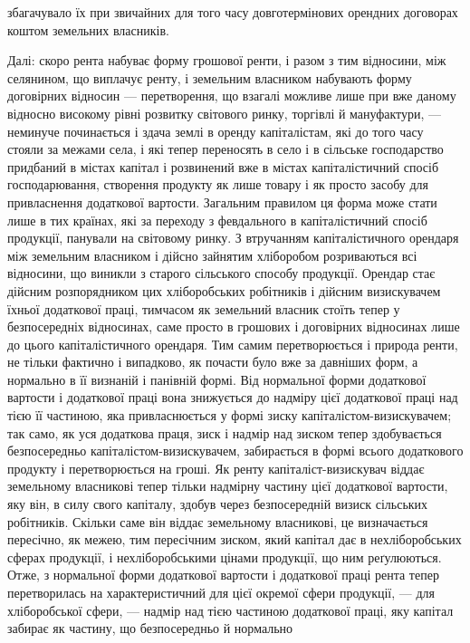 збагачувало їх при звичайних для того часу довготермінових орендних договорах
коштом земельних власників.

Далі: скоро рента набуває форму грошової ренти, і разом з тим відносини,
між селянином, що виплачує ренту, і земельним власником набувають форму
договірних відносин — перетворення, що взагалі можливе лише при вже даному
відносно високому рівні розвитку світового ринку, торгівлі й мануфактури, —
неминуче починається і здача землі в оренду капіталістам, які до того часу
стояли за межами села, і які тепер переносять в село і в сільське господарство
придбаний в містах капітал і розвинений вже в містах капіталістичний спосіб
господарювання, створення продукту як лише товару і як просто засобу для
привласнення додаткової вартости. Загальним правилом ця форма може стати
лише в тих країнах, які за переходу з февдального в капіталістичний спосіб
продукції, панували на світовому ринку. З втручанням капіталістичного орендаря
між земельним власником і дійсно зайнятим хліборобом розриваються всі
відносини, що виникли з старого сільського способу продукції. Орендар стає
дійсним розпорядником цих хліборобських робітників і дійсним визискувачем
їхньої додаткової праці, тимчасом як земельний власник стоїть тепер
у безпосередніх відносинах, саме просто в грошових і договірних відносинах
лише до цього капіталістичного орендаря. Тим самим перетворюється
і природа ренти, не тільки фактично і випадково, як почасти було вже за
давніших форм, а нормально в її визнаній і панівній формі. Від нормальної
форми додаткової вартости і додаткової праці вона знижується до надміру цієї
додаткової праці над тією її частиною, яка привласнюється у формі зиску
капіталістом-визискувачем; так само, як уся додаткова праця, зиск і надмір
над зиском тепер здобувається безпосередньо капіталістом-визискувачем, забирається
в формі всього додаткового продукту і перетворюється на гроші. Як
ренту капіталіст-визискувач віддає земельному власникові тепер тільки надмірну
частину цієї додаткової вартости, яку він, в силу свого капіталу, здобув
через безпосередній визиск сільських робітників. Скільки саме він віддає земельному
власникові, це визначається пересічно, як межею, тим пересічним
зиском, який капітал дає в нехліборобських сферах продукції, і нехліборобськими
цінами продукції, що ним реґулюються. Отже, з нормальної форми додаткової
вартости і додаткової праці рента тепер перетворилась на характеристичний для цієї
окремої сфери продукції, — для хліборобської сфери, — надмір над тією частиною
додаткової праці, яку капітал забирає як частину, що безпосередньо й нормально
